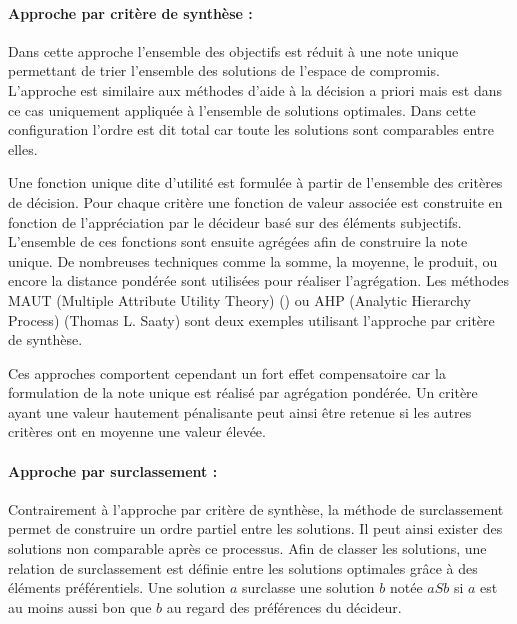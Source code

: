 \paragraph{Approche par critère de synthèse :} %
\label{par:approche_par_critère_de_synthèse}
Dans cette approche l’ensemble des objectifs est réduit à une note unique permettant
de trier l’ensemble des solutions de l’espace de compromis.
L’approche est similaire aux méthodes d’aide à la décision a priori mais est dans
ce cas uniquement appliquée à l’ensemble de solutions optimales. Dans cette
configuration l’ordre est dit total car toute les solutions sont comparables
entre elles.

Une fonction unique dite d’utilité est formulée à partir de l’ensemble des critères
de décision. Pour chaque critère une fonction de valeur associée est construite en
fonction de l’appréciation par le décideur basé sur des éléments subjectifs.
L’ensemble de ces fonctions sont ensuite agrégées afin de construire la note unique.
De nombreuses techniques comme la somme, la moyenne, le produit, ou encore la distance
pondérée sont utilisées pour réaliser l’agrégation.
Les méthodes MAUT (Multiple Attribute Utility Theory) ()
ou AHP (Analytic Hierarchy Process) (Thomas L. Saaty) sont deux exemples utilisant
l’approche par critère de synthèse.


Ces approches comportent cependant un fort effet compensatoire car la formulation
de la note unique est réalisé par agrégation pondérée. Un critère ayant une valeur hautement
pénalisante peut ainsi être retenue si les autres critères ont en moyenne une valeur élevée.


\paragraph{Approche par surclassement :} %
\label{par:approche_par_surclassement}
Contrairement à l’approche par critère de synthèse, la méthode de surclassement
permet de construire un ordre partiel entre les solutions. Il peut ainsi exister
des solutions non comparable après ce processus.
Afin de classer les solutions, une relation de surclassement est définie entre les
solutions optimales grâce à des éléments préférentiels.
Une solution $a$ surclasse une solution $b$ notée $aSb$ si $a$ est au moins aussi
bon que $b$ au regard des préférences du décideur.

